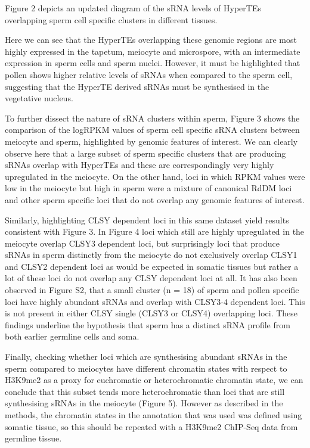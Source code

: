 Figure 2 depicts an updated diagram of the sRNA levels of HyperTEs overlapping sperm cell specific clusters in different tissues.

Here we can see that the HyperTEs overlapping these genomic regions are most highly expressed in the tapetum, meiocyte and microspore, with an intermediate expression in sperm cells and sperm nuclei. However, it must be highlighted that pollen shows higher relative levels of sRNAs when compared to the sperm cell, suggesting that the HyperTE derived sRNAs must be synthesised in the vegetative nucleus.

To further dissect the nature of sRNA clusters within sperm, Figure 3 shows the comparison of the logRPKM values of sperm cell specific sRNA clusters between meiocyte and sperm, highlighted by genomic features of interest. We can clearly observe here that a large subset of sperm specific clusters that are producing sRNAs overlap with HyperTEs and these are correspondingly very highly upregulated in the meiocyte.
On the other hand, loci in which RPKM values were low in the meiocyte but high in sperm were a mixture of canonical RdDM loci and other sperm specific loci that do not overlap any genomic features of interest.

Similarly, highlighting CLSY dependent loci in this same dataset yield results consistent with Figure 3. In Figure 4 loci which still are highly upregulated in the meiocyte overlap CLSY3 dependent loci, but surprisingly loci that produce sRNAs in sperm distinctly from the meiocyte do not exclusively overlap CLSY1 and CLSY2 dependent loci as would be expected in somatic tissues but rather a lot of these loci do not overlap any CLSY dependent loci at all. It has also been observed in Figure S2, that a small cluster (n = 18) of sperm and pollen specific loci have highly abundant sRNAs and overlap with CLSY3-4 dependent loci. This is not present in either CLSY single (CLSY3 or CLSY4) overlapping loci. These findings underline the hypothesis that sperm has a distinct sRNA profile from both earlier germline cells and soma.

Finally, checking whether loci which are synthesising abundant sRNAs in the sperm compared to meiocytes have different chromatin states with respect to H3K9me2 as a proxy for euchromatic or heterochromatic chromatin state, we can conclude that this subset tends more heterochromatic than loci that are still synthesising sRNAs in the meiocyte (Figure 5). However as described in the methods, the chromatin states in the annotation that was used was defined using somatic tissue, so this should be repeated with a H3K9me2 ChIP-Seq data from germline tissue.
 
